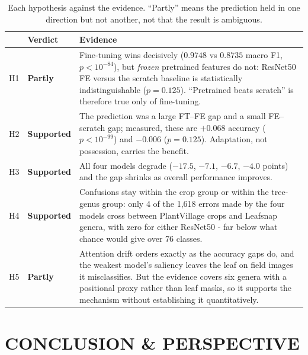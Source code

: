 \documentclass[12pt,a4paper]{article}
\begin{document}
\begin{table}[H]
    \centering
    \caption{Each hypothesis against the evidence. ``Partly'' means the prediction held in one direction but not another, not that the result is ambiguous.}
    \label{tab:hypotheses}
    \begin{tabular}{@{}p{0.8cm}p{2.1cm}p{10.4cm}@{}}
        \toprule
        & Verdict & Evidence \\
        \midrule
        H1 & \textbf{Partly} & Fine-tuning wins decisively ($0.9748$ vs $0.8735$ macro F1, $p<10^{-84}$), but \emph{frozen} pretrained features do not: ResNet50 FE versus the scratch baseline is statistically indistinguishable ($p = 0.125$). ``Pretrained beats scratch'' is therefore true only of fine-tuning. \\
        H2 & \textbf{Supported} & The prediction was a large FT--FE gap and a small FE--scratch gap; measured, these are $+0.068$ accuracy ($p<10^{-99}$) and $-0.006$ ($p = 0.125$). Adaptation, not possession, carries the benefit. \\
        H3 & \textbf{Supported} & All four models degrade ($-17.5$, $-7.1$, $-6.7$, $-4.0$ points) and the gap shrinks as overall performance improves. \\
        H4 & \textbf{Supported} & Confusions stay within the crop group or within the tree-genus group: only 4 of the 1{,}618 errors made by the four models cross between PlantVillage crops and Leafsnap genera, with zero for either ResNet50 - far below what chance would give over 76 classes. \\
        H5 & \textbf{Partly} & Attention drift orders exactly as the accuracy gaps do, and the weakest model's saliency leaves the leaf on field images it misclassifies. But the evidence covers six genera with a positional proxy rather than leaf masks, so it supports the mechanism without establishing it quantitatively. \\
        \bottomrule
    \end{tabular}
\end{table}

\section{CONCLUSION \& PERSPECTIVE}
\label{sec:conclusion}
\end{document}
